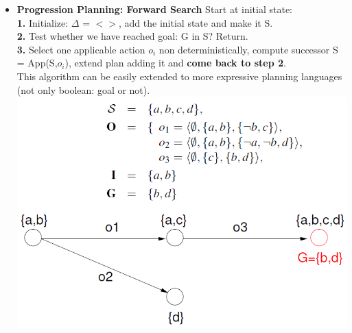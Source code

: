 \documentclass{article}
\begin{document}
\begin{itemize}
\item \textbf{Progression Planning: Forward Search}
Start at initial state:\\
\textbf{1.} Initialize: $\Delta$ = $<>$, add the initial state and make it S.\\
\textbf{2.} Test whether we have reached goal: G in S? Return.\\
\textbf{3.} Select one applicable action \textit{$o_i$} non deterministically, compute successor S = App(S,$o_i$), extend plan adding it and \textbf{come back to step 2}.\\
This algorithm can be easily extended to more expressive planning languages (not only boolean: goal or not).\\ 
\includegraphics[scale=0.6]{56.png}\\\\


\end{itemize}
\end{document}

